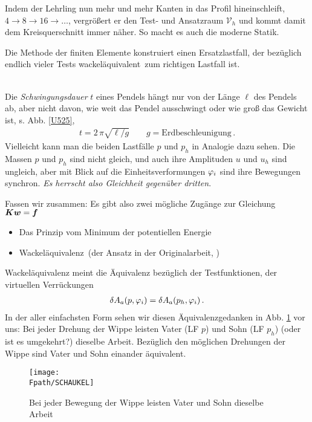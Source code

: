 Indem der Lehrling nun mehr und mehr Kanten in das Profil hineinschleift, $4 \rightarrow 8 \rightarrow 16 \rightarrow \ldots$, vergr\"{o}{\ss}ert er den Test- und Ansatzraum $\mathcal{V}_h$ und kommt damit dem Kreisquerschnitt immer n\"{a}her. So macht es auch die moderne Statik. \\

\hspace*{-12pt}\colorbox{highlightBlue}{\parbox{0.98\textwidth}{ Die Methode der finiten Elemente konstruiert einen Ersatzlastfall, der bez\"{u}glich endlich vieler Tests \glq wackel\"{a}quivalent\grq\ zum richtigen Lastfall ist.}}\\

Die {\em Schwingungsdauer\/} $t$ eines Pendels h\"{a}ngt nur von der L\"{a}nge $ \ell$ des Pendels ab, aber nicht davon, wie weit das Pendel ausschwingt oder wie gro{\ss} das Gewicht ist, s. Abb. \ref{U525},
\begin{align}
t = 2\,\pi \sqrt{{\ell}/{g}} \qquad g = \text{Erdbeschleunigung}\,.
\end{align}
Vielleicht kann man die beiden Lastf\"{a}lle $p$ und $p_h $ in Analogie dazu sehen. Die \glq Massen\grq{} $p$ und $p_h$ sind nicht gleich, und auch ihre \glq Amplituden\grq{} $u$ und $u_h$ sind ungleich, aber mit Blick auf die Einheitsverformungen $\varphi_i $ sind ihre Bewegungen \glq synchron\grq. {\em Es herrscht also Gleichheit gegen\"{u}ber dritten\/}.

Fassen wir zusammen: Es gibt also zwei m\"{o}gliche Zug\"{a}nge zur Gleichung $\mbox{\boldmath $K$}\mbox{\boldmath $w$} = \mbox{\boldmath $f$}$\\
\begin{itemize}
  \item Das Prinzip vom Minimum der potentiellen  Energie
  \item \glq Wackel\"{a}quivalenz\grq\ (der Ansatz in der Originalarbeit, \cite{Turner})
\end{itemize}
Wackel\"{a}quivalenz meint die \"{A}quivalenz bez\"{u}glich der Testfunktionen, der virtuellen Verr\"{u}ckungen
\begin{align}
\delta A_a(p,\varphi_i) = \delta A_a(p_h,\varphi_i)\,.
\end{align}
In der aller einfachsten Form sehen wir diesen \"{A}quivalenzgedanken in Abb. \ref{Schaukel} vor uns: Bei jeder Drehung der Wippe leisten Vater (LF $p$) und Sohn (LF $p_h$) (oder ist es umgekehrt?) dieselbe Arbeit. Bez\"{u}glich den m\"{o}glichen Drehungen der Wippe sind Vater und Sohn einander \"{a}quivalent.

\begin{figure}[tbp] \centering
\if {} \sidecaption \fi
\texttt{[image: \\Fpath/SCHAUKEL]}
\caption{Bei jeder Bewegung der Wippe leisten Vater und Sohn dieselbe Arbeit}
\label{Schaukel}
\end{figure}%

